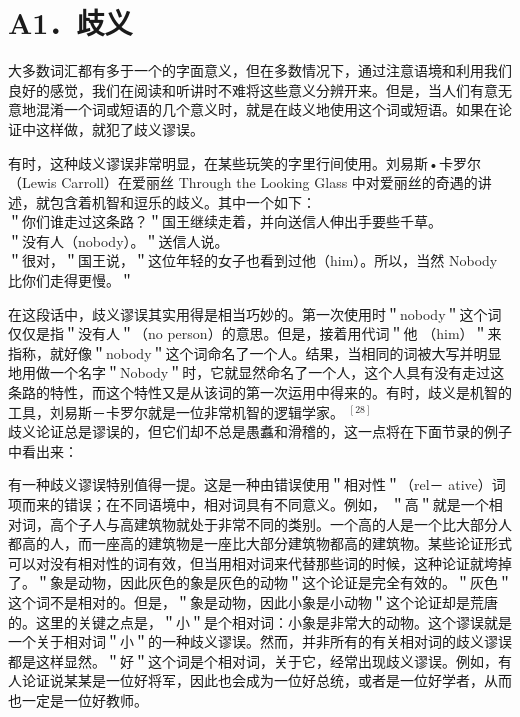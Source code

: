 \section*{A1．歧义}
大多数词汇都有多于一个的字面意义，但在多数情况下，通过注意语境和利用我们良好的感觉，我们在阅读和听讲时不难将这些意义分辨开来。但是，当人们有意无意地混淆一个词或短语的几个意义时，就是在歧义地使用这个词或短语。如果在论证中这样做，就犯了歧义谬误。

有时，这种歧义谬误非常明显，在某些玩笑的字里行间使用。刘易斯•卡罗尔（Lewis Carroll）在爱丽丝 Through the Looking Glass 中对爱丽丝的奇遇的讲述，就包含着机智和逗乐的歧义。其中一个如下：\\
＂你们谁走过这条路？＂国王继续走着，并向送信人伸出手要些千草。\\
＂没有人（nobody）。＂送信人说。\\
＂很对，＂国王说，＂这位年轻的女子也看到过他（him）。所以，当然 Nobody 比你们走得更慢。＂

在这段话中，歧义谬误其实用得是相当巧妙的。第一次使用时＂nobody＂这个词仅仅是指＂没有人＂（no person）的意思。但是，接着用代词＂他 （him）＂来指称，就好像＂nobody＂这个词命名了一个人。结果，当相同的词被大写并明显地用做一个名字＂Nobody＂时，它就显然命名了一个人，这个人具有没有走过这条路的特性，而这个特性又是从该词的第一次运用中得来的。有时，歧义是机智的工具，刘易斯－卡罗尔就是一位非常机智的逻辑学家。 ${ }^{[28]}$\\
歧义论证总是谬误的，但它们却不总是愚䘄和滑稽的，这一点将在下面节录的例子中看出来：

有一种歧义谬误特别值得一提。这是一种由错误使用＂相对性＂（rel－ ative）词项而来的错误；在不同语境中，相对词具有不同意义。例如， ＂高＂就是一个相对词，高个子人与高建筑物就处于非常不同的类别。一个高的人是一个比大部分人都高的人，而一座高的建筑物是一座比大部分建筑物都高的建筑物。某些论证形式可以对没有相对性的词有效，但当用相对词来代替那些词的时候，这种论证就垮掉了。＂象是动物，因此灰色的象是灰色的动物＂这个论证是完全有效的。＂灰色＂这个词不是相对的。但是，＂象是动物，因此小象是小动物＂这个论证却是荒唐的。这里的关键之点是，＂小＂是个相对词：小象是非常大的动物。这个谬误就是一个关于相对词＂小＂的一种歧义谬误。然而，并非所有的有关相对词的歧义谬误都是这样显然。＂好＂这个词是个相对词，关于它，经常出现歧义谬误。例如，有人论证说某某是一位好将军，因此也会成为一位好总统，或者是一位好学者，从而也一定是一位好教师。 